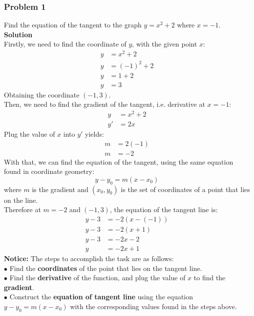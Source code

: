 \documentclass[hidelinks, a4paper, 12pt]{article}
\newcommand{\bd}{\textbf}
\newcommand{\n}{\\[\baselineskip]}
\begin{document}
            \subsubsection{Problem 1}
                Find the equation of the tangent to the graph $y = x^2 + 2$ where $x = -1$.\n
                \bd{Solution}\n
                Firstly, we need to find the coordinate of $y$, with the given point $x$:
                \[\begin{split}
                    y &= x^2+2\\
                    y &= (-1)^2+2\\
                    y &= 1+2\\
                    y &= 3
                \end{split}\]
                Obtaining the coordinate $(-1, 3)$.\n
                Then, we need to find the gradient of the tangent, i.e. derivative at $x = -1$:
                \[\begin{split}
                    y &= x^2 + 2\\
                    y' &= 2x
                \end{split}\]
                Plug the value of $x$ into $y'$ yields:
                \[\begin{split}
                    m &= 2(-1)\\
                    m &= -2
                \end{split}\]
                With that, we can find the equation of the tangent, using the same equation found in coordinate geometry:
                \[y-y_0 = m(x-x_0)\]
                where $m$ is the gradient and $(x_0, y_0)$ is the set of coordinates of a point that lies on the line.\n
                Therefore at $m = -2$ and $(-1, 3)$, the equation of the tangent line is:
                \[\begin{split}
                    y - 3 &= -2(x-(-1))\\
                    y - 3 &= -2(x+1)\\
                    y - 3 &= -2x -2\\
                    y & = -2x +1
                \end{split}\]
                \bd{Notice: }The steps to accomplish the task are as follows:\n
                $\bullet$ Find the \bd{coordinates} of the point that lies on the tangent line.\n
                $\bullet$ Find the \bd{derivative} of the function, and plug the value of $x$ to find the \bd{gradient}.\n
                $\bullet$ Construct the \bd{equation of tangent line} using the equation $y-y_0 = m(x-x_0)$ with the corresponding
                values found in the steps above.
            
\end{document}
